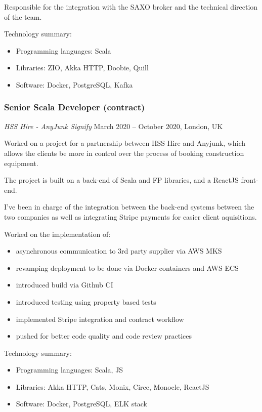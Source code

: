 \documentclass[
]{rss}
\providecommand{\tightlist}{%
  \setlength{\itemsep}{0pt}\setlength{\parskip}{0pt}}
\begin{document}
\begin{resume}
Responsible for the integration with the SAXO broker and the technical
direction of the team.

Technology summary:

\begin{itemize}
\tightlist
\item
  Programming languages: Scala
\item
  Libraries: ZIO, Akka HTTP, Doobie, Quill
\item
  Software: Docker, PostgreSQL, Kafka
\end{itemize}

\hypertarget{senior-scala-developer-contract}{%
\subsubsection{Senior Scala Developer
(contract)}\label{senior-scala-developer-contract}}

\emph{HSS Hire - AnyJunk \textbar{} Signify} March 2020 -- October 2020,
London, UK

Worked on a project for a partnership between HSS Hire and Anyjunk,
which allows the clients be more in control over the process of booking
construction equipment.

The project is built on a back-end of Scala and FP libraries, and a
ReactJS front-end.

I've been in charge of the integration between the back-end systems
between the two companies as well as integrating Stripe payments for
easier client aquisitions.

Worked on the implementation of:

\begin{itemize}
\tightlist
\item
  asynchronous communication to 3rd party supplier via AWS MKS
\item
  revamping deployment to be done via Docker containers and AWS ECS
\item
  introduced build via Github CI
\item
  introduced testing using property based tests
\item
  implemented Stripe integration and contract workflow
\item
  pushed for better code quality and code review practices
\end{itemize}

Technology summary:

\begin{itemize}
\tightlist
\item
  Programming languages: Scala, JS
\item
  Libraries: Akka HTTP, Cats, Monix, Circe, Monocle, ReactJS
\item
  Software: Docker, PostgreSQL, ELK stack
\end{itemize}


\end{resume}
\end{document}
